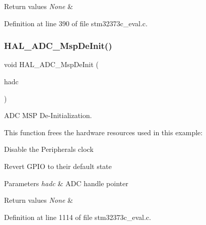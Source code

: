 \begin{DoxyRetVals}{Return values}
{\em None} & \\
\hline
\end{DoxyRetVals}


Definition at line 390 of file stm32373c\+\_\+eval.\+c.

\mbox{\label{group___private___functions_ga39b0f8e80268ab3e660ead921ad4b22f}} 
\subsubsection{H\+A\+L\+\_\+\+A\+D\+C\+\_\+\+Msp\+De\+Init()}
{\footnotesize\ttfamily void H\+A\+L\+\_\+\+A\+D\+C\+\_\+\+Msp\+De\+Init (\begin{DoxyParamCaption}\item[{A\+D\+C\+\_\+\+Handle\+Type\+Def $\ast$}]{hadc }\end{DoxyParamCaption})}



A\+DC M\+SP De-\/\+Initialization. 

This function frees the hardware resources used in this example\+:


\begin{DoxyItemize}
\item Disable the Peripheral\textquotesingle{}s clock
\item Revert G\+P\+IO to their default state
\end{DoxyItemize}


\begin{DoxyParams}{Parameters}
{\em hadc} & A\+DC handle pointer\\
\hline
\end{DoxyParams}

\begin{DoxyRetVals}{Return values}
{\em None} & \\
\hline
\end{DoxyRetVals}


Definition at line 1114 of file stm32373c\+\_\+eval.\+c.

\mbox{\label{group___private___functions_gaa30863492d5c3103e3e8ce8a63dadd07}} 
